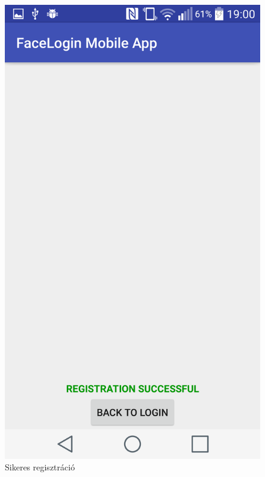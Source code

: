 \begin{figure}[h]
\begin{minipage}{.30\textwidth}
     \includegraphics[scale=0.10]{img/registration_successful}
     \caption{Sikeres regisztráció}
 \end{minipage}
\end{figure}

